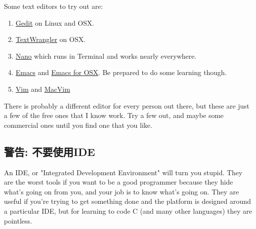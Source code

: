Some text editors to try out are:

\begin{enumerate}
\item \href{http://projects.gnome.org/gedit/}{Gedit} on Linux and OSX.
\item \href{http://www.barebones.com/products/textwrangler/}{TextWrangler} on OSX.
\item \href{http://www.nano-editor.org/}{Nano} which runs in Terminal and works nearly everywhere.
\item \href{http://www.gnu.org/software/emacs/}{Emacs} and \href{http://emacsformacosx.com/}{Emacs for OSX}.  Be prepared to do some learning though.
\item \href{http://www.vim.org/}{Vim} and \href{http://code.google.com/p/macvim/}{MacVim}
\end{enumerate}

There is probably a different editor for every person out there, but these are
just a few of the free ones that I know work.  Try a few out, and maybe some
commercial ones until you find one that you like.

\subsection{警告: 不要使用IDE}

An IDE, or "Integrated Development Environment" will turn you stupid.  They are
the worst tools if you want to be a good programmer because they hide what's
going on from you, and your job is to know what's going on.  They are useful
if you're trying to get something done and the platform is designed around 
a particular IDE, but for learning to code C (and many other languages) they
are pointless.


